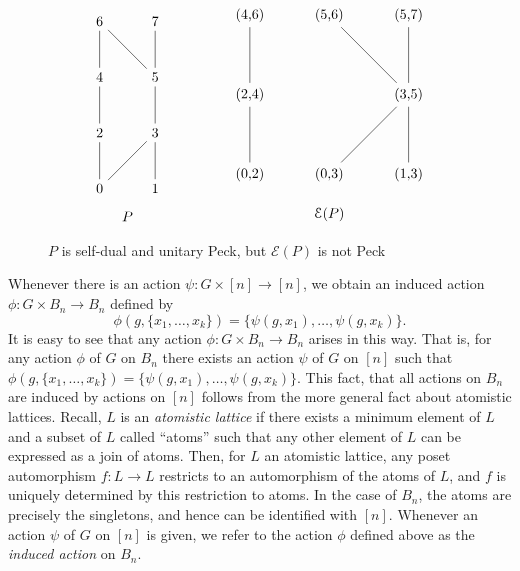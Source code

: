 \documentclass[smallextended, envcountsame, numbook]{svjour3}
\numberwithin{equation}{section}
\begin{document}
\begin{figure}[h]
\label{fig:dual_not_unimodal}
\[
\begin{tikzpicture}[scale = .7]
  \node (0) at (0,0) {0};
  \node (1) at (2,0) {1};
  \node (2) at (0,2) {2};
  \node (3) at (2,2) {3};
  \node (4) at (0,4) {4};
  \node (5) at (2,4) {5};
  \node (6) at (0,6) {6};
  \node (7) at (2,6) {7};
  \draw (0)--(2);
  \draw (0)--(3);
  \draw (1)--(3);
  \draw (2)--(4);
  \draw (3)--(5);
  \draw (4)--(6);
  \draw (5)--(6);
  \draw (5)--(7);
  \node (8) at (1,-1) {$P$};
\end{tikzpicture}\qquad \hspace{10mm}
\begin{tikzpicture}
  \node (02) at (0,0) {(0,2)};
  \node (03) at (2,0) {(0,3)};
  \node (13) at (4,0) {(1,3)};
  \node (24) at (0,2) {(2,4)};
  \node (35) at (4,2) {(3,5)};
  \node (46) at (0,4) {(4,6)};
  \node (56) at (2,4) {(5,6)};
  \node (57) at (4,4) {(5,7)};
  \draw (02)--(24);
  \draw (03)--(35);
  \draw (13)--(35);
  \draw (24)--(46);
  \draw (35)--(56);
  \draw (35)--(57);
  \node (0) at (2,-1) {$\mathcal{E}(P)$};
\end{tikzpicture}\]
\caption{$P$ is self-dual and unitary Peck, but $\mathcal{E}(P)$ is not Peck}
\end{figure}


\begin{remark}
\label{rem:induced_action_bn}
Whenever there is an action $\psi\colon G \times [n] \rightarrow [n]$, we obtain an induced action $\phi: G \times B_n \rightarrow B_n$ defined by
$$\phi(g,\{x_1,\ldots, x_k\}) = \{\psi(g,x_1),\ldots, \psi(g,x_k)\}.$$
It is easy to see that any action $\phi\colon G \times B_n \rightarrow B_n$ arises in this way. That is, for any action $\phi$ of $G$ on $B_n$ there exists an action $\psi$ of $G$ on $[n]$ such that $\phi(g,\{x_1,\ldots, x_k\}) = \{\psi(g,x_1),\ldots, \psi(g,x_k)\}$. This fact, that all actions on $B_n$ are induced by actions on $[n]$ follows from the more general fact about atomistic lattices. Recall, $L$ is an {\it atomistic lattice} if there exists a minimum element of $L$ and a subset of $L$ called ``atoms'' such that any other element of $L$ can be expressed as a join of atoms. Then, for $L$ an atomistic lattice, any poset automorphism $f\colon L \rightarrow L$ restricts to an automorphism of the atoms of $L$, and $f$ is uniquely determined by this restriction to atoms. In the case of $B_n$, the atoms are precisely the singletons, and hence can be identified with $[n]$.  Whenever an action $\psi$ of $G$ on $[n]$ is given, we refer to the action $\phi$ defined above as the {\it induced action} on $B_n$.
\end{remark}
\end{document}
